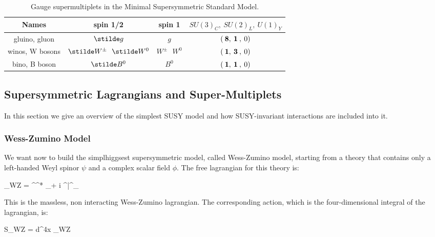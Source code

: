 \renewcommand{\arraystretch}{1.55}
\begin{table}[t]
\begin{center}
\begin{tabular}{c c c c}
\hline
Names & spin 1/2 & spin 1 & $SU(3)_C, \> SU(2)_L,\> U(1)_Y$\\
\hline\hline
gluino, gluon &$ \stilde g$& $g$ & $(\>{\bf 8},\>{\bf 1}\>,\> 0)$
\\
\hline
winos, W bosons & $ \stilde W^\pm\>\>\> \stilde W^0 $&
 $W^\pm\>\>\> W^0$ & $(\>{\bf 1},\>{\bf 3}\>,\> 0)$
\\
\hline
bino, B boson &$\stilde B^0$&
 $B^0$ & $(\>{\bf 1},\>{\bf 1}\>,\> 0)$
\\
\hline
\end{tabular}
\caption{Gauge supermultiplets in
the Minimal Supersymmetric Standard Model.\label{tab:gauge}}
\vspace{-0.45cm}
\end{center}
\end{table}


\subsection{Supersymmetric Lagrangians and Super-Multiplets}

In this section we give an overview of the simplest SUSY model and how SUSY-invariant interactions are included into it.

\subsubsection*{Wess-Zumino Model}

We want now to build the simplhiggsest supersymmetric model, called Wess-Zumino model, starting from a theory that contains only a left-handed Weyl spinor $\psi$ and a complex scalar field $\phi$. The free lagrangian for this theory is:

\beq
{}_{WZ} = \partial^\mu \phi^* \partial_\mu \phi + i \psi^\dagger \bar{\sigma}^\mu \partial_\mu \psi
\label{eq:WZL}
\eeq

This is the massless, non interacting Wess-Zumino lagrangian. The corresponding action, which is the four-dimensional integral of the lagrangian, is:

\beq
S_{WZ} = \int d^4x \; _{WZ}
\eeq

